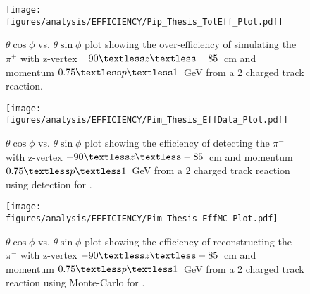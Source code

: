 \begin{figure}[h!]\begin{center}
\texttt{[image: \\figures/analysis/EFFICIENCY/Pip\_Thesis\_TotEff\_Plot.pdf]}
\caption[$\theta \cos\phi$ vs. $\theta \sin\phi$ plot showing the over-efficiency of simulating the $\pi^+$ with z-vertex $-90\textless z\textless-85$~cm and momentum $0.75\textless p \textless 1$~GeV from a 2 charged track reaction]{\label{fig:toteff_pip} $\theta \cos\phi$ vs. $\theta \sin\phi$ plot showing the over-efficiency of simulating the $\pi^+$ with z-vertex $-90\textless z\textless-85$~cm and momentum $0.75\textless p \textless 1$~GeV from a 2 charged track reaction.}
\end{center}\end{figure}
\begin{figure}[h!]\begin{center}
\texttt{[image: \\figures/analysis/EFFICIENCY/Pim\_Thesis\_EffData\_Plot.pdf]}
\caption[$\theta \cos\phi$ vs. $\theta \sin\phi$ plot showing the efficiency of detecting the $\pi^-$ with z-vertex $-90\textless z\textless-85$~cm and momentum $0.75\textless p \textless 1$~GeV from a 2 charged track reaction using  detection for ]{\label{fig:eff_pim_data} $\theta \cos\phi$ vs. $\theta \sin\phi$ plot showing the efficiency of detecting the $\pi^-$ with z-vertex $-90\textless z\textless-85$~cm and momentum $0.75\textless p \textless 1$~GeV from a 2 charged track reaction using  detection for .}
\end{center}\end{figure}
%
\begin{figure}[h!]\begin{center}
\texttt{[image: \\figures/analysis/EFFICIENCY/Pim\_Thesis\_EffMC\_Plot.pdf]}
\caption[$\theta \cos\phi$ vs. $\theta \sin\phi$ plot showing the efficiency of reconstructing the $\pi^-$ with z-vertex $-90\textless z\textless-85$~cm and momentum $0.75\textless p \textless 1$~GeV from a 2 charged track reaction using  Monte-Carlo for ]{\label{fig:eff_pim_MC} $\theta \cos\phi$ vs. $\theta \sin\phi$ plot showing the efficiency of reconstructing the $\pi^-$ with z-vertex $-90\textless z\textless-85$~cm and momentum $0.75\textless p \textless 1$~GeV from a 2 charged track reaction using  Monte-Carlo for .}
\end{center}\end{figure}
%
